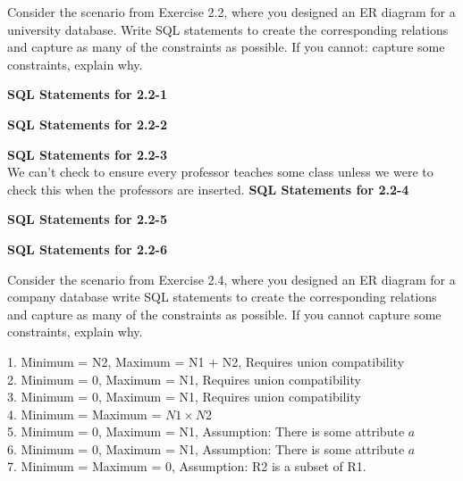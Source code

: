 

\lstset{language=SQL,breaklines=true}



\homeworkheader{\classnameandsection}

\begin{problem}{3.12}
  Consider the scenario from Exercise 2.2, where you designed an ER diagram for a university database. Write SQL
  statements to create the corresponding relations and capture as many of the constraints as possible. If you cannot:
  capture some constraints, explain why.
  \begin{solution}
    \textbf{SQL Statements for 2.2-1}
    
    \textbf{SQL Statements for 2.2-2}
    
    \textbf{SQL Statements for 2.2-3} \\
    We can't check to ensure every professor teaches some class unless we were to check this when the professors are
    inserted.
    \br
    \textbf{SQL Statements for 2.2-4}
    
    \textbf{SQL Statements for 2.2-5}
    
    \textbf{SQL Statements for 2.2-6}
    
  \end{solution}
\end{problem}

\begin{problem}{3.14}
  Consider the scenario from Exercise 2.4, where you designed an ER diagram for a company database write SQL statements
  to create the corresponding relations and capture as many of the constraints as possible. If you cannot capture some
  constraints, explain why.
  \begin{solution}
    
  \end{solution}
\end{problem}

\begin{problem}{4.2}
  \begin{solution}
    1. Minimum = N2, Maximum = N1 + N2, Requires union compatibility\\
    2. Minimum = 0, Maximum = N1, Requires union compatibility\\
    3. Minimum = 0, Maximum = N1, Requires union compatibility \\
    4. Minimum = Maximum = $N1 \times N2$ \\
    5. Minimum = 0, Maximum = N1, Assumption: There is some attribute $a$ \\
    6. Minimum = 0, Maximum = N1, Assumption: There is some attribute $a$ \\
    7. Minimum = Maximum = 0, Assumption: R2 is a subset of R1.
  \end{solution}
\end{problem}

